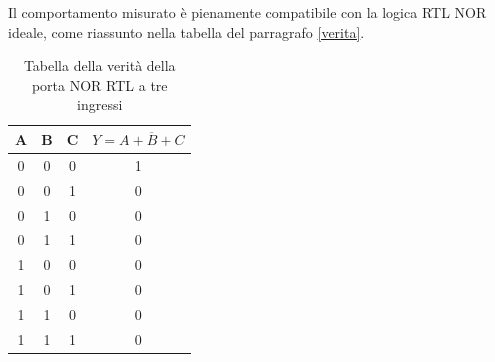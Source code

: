 \documentclass[a4paper,12pt]{article}
\begin{document}
Il comportamento misurato è pienamente compatibile con la logica RTL NOR ideale, come riassunto nella tabella del parragrafo \ref{verita}.

\begin{table}[H] \label{tab:verita}
  \centering
  \begin{tabular}{ccc|c}
    A & B & C & \(Y = \overline{A + B + C}\) \\
    \hline
    0 & 0 & 0 & 1 \\
    0 & 0 & 1 & 0 \\
    0 & 1 & 0 & 0 \\
    0 & 1 & 1 & 0 \\
    1 & 0 & 0 & 0 \\
    1 & 0 & 1 & 0 \\
    1 & 1 & 0 & 0 \\
    1 & 1 & 1 & 0 \\
  \end{tabular}
  \caption{Tabella della verità della porta NOR RTL a tre ingressi}
\end{table}
\end{document}
